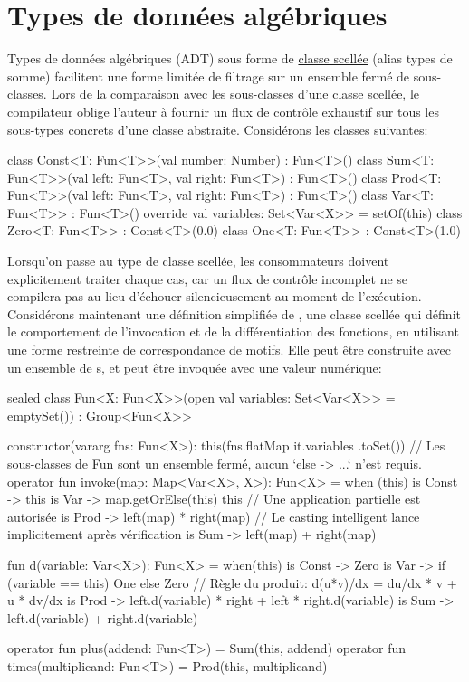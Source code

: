 \section{Types de données algébriques}\label{sec:adts}

\noindent Types de données algébriques (ADT) sous forme de \href{https://kotlinlang.org/docs/reference/sealed-classes.html}{classe scellée} (alias types de somme) facilitent une forme limitée de filtrage sur un ensemble fermé de sous-classes. Lors de la comparaison avec les sous-classes d'une classe scellée, le compilateur oblige l'auteur à fournir un flux de contrôle exhaustif sur tous les sous-types concrets d'une classe abstraite. Considérons les classes suivantes:
%
\begin{kotlinlisting}
class Const<T: Fun<T>>(val number: Number) : Fun<T>()
class Sum<T: Fun<T>>(val left: Fun<T>, val right: Fun<T>) : Fun<T>()
class Prod<T: Fun<T>>(val left: Fun<T>, val right: Fun<T>) : Fun<T>()
class Var<T: Fun<T>> : Fun<T>() { override val variables: Set<Var<X>> = setOf(this) }
class Zero<T: Fun<T>> : Const<T>(0.0)
class One<T: Fun<T>> : Const<T>(1.0)
\end{kotlinlisting}
%
Lorsqu'on passe au type de classe scellée, les consommateurs doivent explicitement traiter chaque cas, car un flux de contrôle incomplet ne se compilera pas au lieu d'échouer silencieusement au moment de l'exécution. Considérons maintenant une définition simplifiée de , une classe scellée qui définit le comportement de l'invocation et de la différentiation des fonctions, en utilisant une forme restreinte de correspondance de motifs. Elle peut être construite avec un ensemble de s, et peut être invoquée avec une valeur numérique:
%
\begin{kotlinlisting}
sealed class Fun<X: Fun<X>>(open val variables: Set<Var<X>> = emptySet()) : Group<Fun<X>> {
    constructor(vararg fns: Fun<X>): this(fns.flatMap { it.variables }.toSet())
    // Les sous-classes de Fun sont un ensemble fermé, aucun `else -> ...` n'est requis.
    operator fun invoke(map: Map<Var<X>, X>): Fun<X> = when (this) {
        is Const -> this
        is Var -> map.getOrElse(this) { this } // Une application partielle est autorisée
        is Prod -> left(map) * right(map) // Le casting intelligent lance implicitement après vérification
        is Sum -> left(map) + right(map)
    }

    fun d(variable: Var<X>): Fun<X> = when(this) {
        is Const -> Zero
        is Var -> if (variable == this) One else Zero
        // Règle du produit: d(u*v)/dx = du/dx * v + u * dv/dx
        is Prod -> left.d(variable) * right + left * right.d(variable)
        is Sum -> left.d(variable) + right.d(variable)
    }

    operator fun plus(addend: Fun<T>) = Sum(this, addend)
    operator fun times(multiplicand: Fun<T>) = Prod(this, multiplicand)
}
\end{kotlinlisting}

